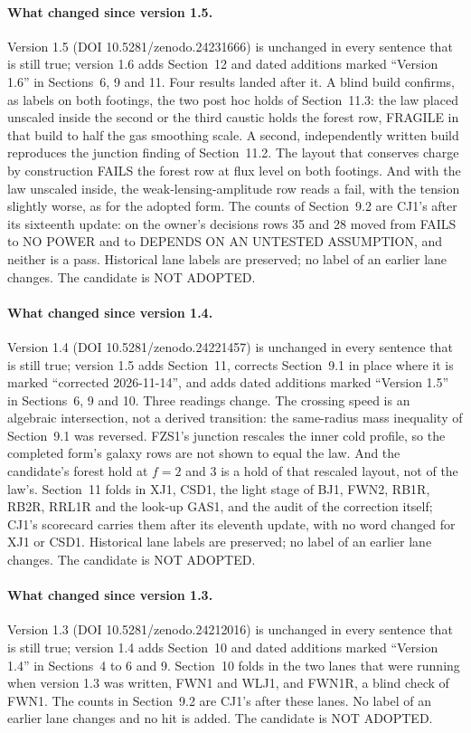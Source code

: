 \documentclass[10pt]{article}
\begin{document}
\paragraph{What changed since version 1.5.} Version 1.5 (DOI 10.5281/zenodo.24231666) is unchanged in every sentence that is still true; version 1.6 adds Section~12 and dated additions marked ``Version 1.6'' in Sections~6, 9 and 11. Four results landed after it. A blind build confirms, as labels on both footings, the two post hoc holds of Section~11.3: the law placed unscaled inside the second or the third caustic holds the forest row, FRAGILE in that build to half the gas smoothing scale. A second, independently written build reproduces the junction finding of Section~11.2. The layout that conserves charge by construction FAILS the forest row at flux level on both footings. And with the law unscaled inside, the weak-lensing-amplitude row reads a fail, with the tension slightly worse, as for the adopted form. The counts of Section~9.2 are CJ1's after its sixteenth update: on the owner's decisions rows 35 and 28 moved from FAILS to NO POWER and to DEPENDS ON AN UNTESTED ASSUMPTION, and neither is a pass. Historical lane labels are preserved; no label of an earlier lane changes. The candidate is NOT ADOPTED.

\paragraph{What changed since version 1.4.} Version 1.4 (DOI 10.5281/zenodo.24221457) is unchanged in every sentence that is still true; version 1.5 adds Section~11, corrects Section~9.1 in place where it is marked ``corrected 2026-11-14'', and adds dated additions marked ``Version 1.5'' in Sections~6, 9 and 10. Three readings change. The crossing speed is an algebraic intersection, not a derived transition: the same-radius mass inequality of Section~9.1 was reversed. FZS1's junction rescales the inner cold profile, so the completed form's galaxy rows are not shown to equal the law. And the candidate's forest hold at $f=2$ and 3 is a hold of that rescaled layout, not of the law's. Section~11 folds in XJ1, CSD1, the light stage of BJ1, FWN2, RB1R, RB2R, RRL1R and the look-up GAS1, and the audit of the correction itself; CJ1's scorecard carries them after its eleventh update, with no word changed for XJ1 or CSD1. Historical lane labels are preserved; no label of an earlier lane changes. The candidate is NOT ADOPTED.

\paragraph{What changed since version 1.3.} Version 1.3 (DOI 10.5281/zenodo.24212016) is unchanged in every sentence that is still true; version 1.4 adds Section~10 and dated additions marked ``Version 1.4'' in Sections~4 to 6 and 9. Section~10 folds in the two lanes that were running when version 1.3 was written, FWN1 and WLJ1, and FWN1R, a blind check of FWN1. The counts in Section~9.2 are CJ1's after these lanes. No label of an earlier lane changes and no hit is added. The candidate is NOT ADOPTED.
\end{document}
